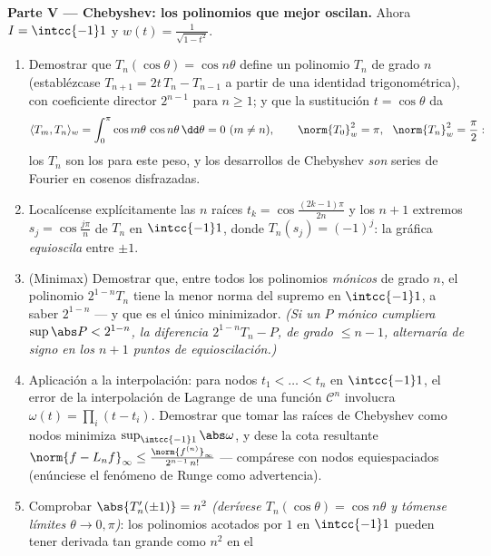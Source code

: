 \begin{problem}
\medskip
\noindent\textbf{Parte V --- Chebyshev: los polinomios que mejor
oscilan.} Ahora $I = \intcc{-1}1$ y $w(t) =
\frac1{\sqrt{1 - t^2}}$.
\begin{enumerate}[resume]
  \item Demostrar que $T_n(\cos\theta) = \cos n\theta$ define un
  polinomio $T_n$ de grado $n$ (establézcase $T_{n+1} =
        2t\,T_n - T_{n-1}$ a partir de una identidad trigonométrica),
  con coeficiente director $2^{n-1}$ para $n \geq 1$; y que la
  sustitución $t = \cos\theta$ da
        \[
        \langle T_m, T_n\rangle_w =
        \int_0^\pi\cos m\theta\,\cos n\theta\,\dd\theta
        = 0 \ (m \neq n), \qquad
        \norm{T_0}_w^2 = \pi,\ \ \norm{T_n}_w^2 = \frac\pi2 :
        \]
        los $T_n$ son los  para este peso, y los desarrollos de Chebyshev
        \emph{son} series de Fourier en cosenos disfrazadas. \item
        Localícense explícitamente las $n$ raíces $t_k =
        \cos\frac{(2k-1)\pi}{2n}$ y los $n + 1$ extremos
        $s_j = \cos\frac{j\pi}n$ de $T_n$ en $\intcc{-1}1$, donde
        $T_n(s_j) = (-1)^j$: la gráfica \emph{equioscila} entre $\pm1$.
        \item (Minimax) Demostrar que, entre todos los polinomios
        \emph{mónicos} de grado $n$, el polinomio $2^{1-n}T_n$ tiene la
        menor norma del supremo en $\intcc{-1}1$, a saber $2^{1-n}$ ---
        y que es el único minimizador. \emph{(Si un $P$ mónico cumpliera
        $\sup\abs P < 2^{1-n}$, la diferencia $2^{1-n}T_n -
        P$, de grado $\leq n-1$, alternaría de signo en los $n+1$ puntos
        de equioscilación.)} \item Aplicación a la interpolación: para
        nodos $t_1 < \dots
        < t_n$ en $\intcc{-1}1$, el error de la interpolación de
        Lagrange de una función $\mathcal C^n$ involucra
        $\omega(t) = \prod_i(t - t_i)$. Demostrar que tomar las raíces
        de Chebyshev como nodos minimiza $\sup_{\intcc{-1}1}\abs\omega$,
        y dese la cota resultante $\norm{f -
        L_nf}_\infty \leq \frac{\norm{f^{(n)}}_\infty}
        {2^{n-1}\,n!}$ --- compárese con nodos equiespaciados (enúnciese
        el fenómeno de Runge como advertencia). \item Comprobar
        $\abs{T_n'(\pm1)} = n^2$ \emph{(derívese
        $T_n(\cos\theta) = \cos n\theta$ y tómense límites
        $\theta \to 0, \pi$)}: los polinomios acotados por $1$ en
        $\intcc{-1}1$ pueden tener derivada tan grande como $n^2$ en el

\end{enumerate}
\end{problem}
